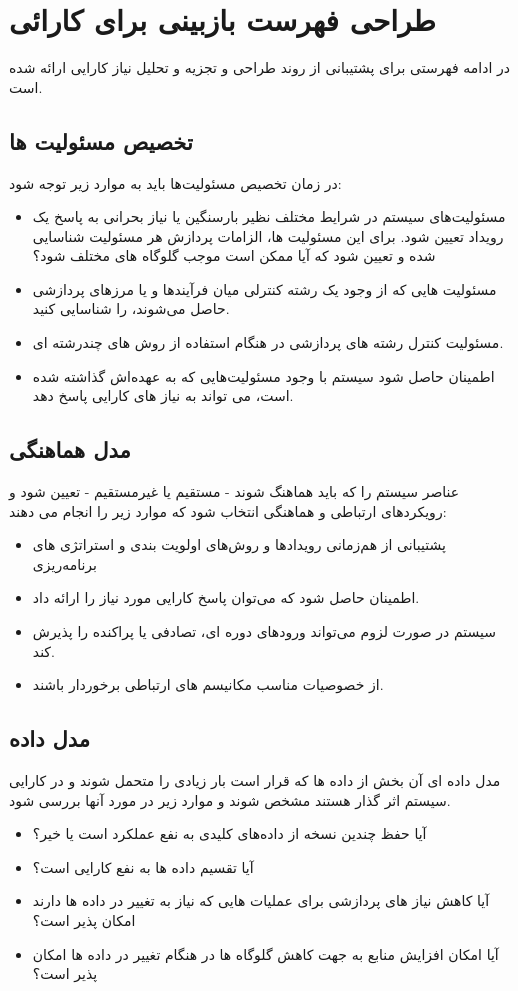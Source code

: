 \section{طراحی فهرست بازبینی برای کارائی}
در ادامه فهرستی برای پشتیبانی از روند طراحی و تجزیه و تحلیل نیاز کارایی ارائه شده است.
\subsection{تخصیص مسئولیت ها} 
در زمان تخصیص مسئولیت‌ها باید  به موارد زیر توجه شود:
\begin{itemize}
\item
مسئولیت‌های سیستم در شرایط مختلف نظیر بارسنگین  یا نیاز بحرانی به پاسخ یک رویداد تعیین شود. برای این مسئولیت ها، الزامات پردازش هر مسئولیت شناسایی شده و تعیین شود که آیا ممکن است موجب گلوگاه های مختلف شود؟
\item
مسئولیت هایی که از وجود یک رشته کنترلی میان فرآیندها و یا مرزهای پردازشی حاصل می‌شوند،‌ را شناسایی کنید.
\item
مسئولیت کنترل رشته های پردازشی در هنگام استفاده از روش های چند‌رشته ای.
\item
اطمینان حاصل شود سیستم با وجود مسئولیت‌هایی که به عهده‌اش گذاشته شده است،‌ می تواند به نیاز های کارایی پاسخ دهد.
\end{itemize}
\subsection{مدل هماهنگی}
عناصر سیستم را که باید هماهنگ شوند - مستقیم یا غیرمستقیم - تعیین شود و رویکرد‌های ارتباطی و هماهنگی انتخاب شود که موارد زیر را انجام می دهند:
\begin{itemize}
\item
پشتیبانی از هم‌زمانی رویداد‌ها و روش‌های اولویت بندی و استراتژی های برنامه‌ریزی
\item
اطمینان حاصل شود که می‌توان پاسخ کارایی مورد نیاز را ارائه داد.
\item
سیستم در صورت لزوم می‌تواند ورودهای دوره ای، تصادفی یا پراکنده را پذیرش کند.
\item
از خصوصیات مناسب مکانیسم های ارتباطی برخوردار باشند.
\end{itemize}
\subsection{مدل داده}
مدل داده ای آن بخش از داده ها که قرار است بار زیادی را متحمل شوند و در کارایی سیستم اثر گذار هستند مشخص شوند و موارد زیر در مورد آنها بررسی شود.
\begin{itemize}
\item
آیا حفظ چندین نسخه از داده‌های کلیدی به نفع عملکرد است یا خیر؟
\item
آیا تقسیم داده ها به نفع کارایی است؟
\item
آیا کاهش نیاز های پردازشی برای عملیات هایی که نیاز به تغییر در داده ها دارند امکان پذیر است؟
\item
آیا امکان افزایش منابع به جهت کاهش گلوگاه ها در هنگام تغییر در داده ها امکان پذیر است؟
\end{itemize}
